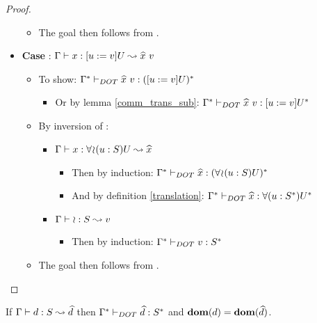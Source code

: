 \begin{proof}
\begin{itemize}
\begin{itemize}
\begin{itemize}
\begin{itemize}
                \end{itemize}
            \end{itemize}
            \item The goal then follows from .
        \end{itemize}
        \item \textbf{Case} :
            $\Gamma \vdash x: [u := v]U \leadsto \widehat{x}\ v$
        \begin{itemize}
            \item To show:
                $\TJT{\TRANS{\Gamma}}{\HAT{x}\ v}{\TRANS{(\SUB{u}{v}U)}}$
            \begin{itemize}
                \item Or by lemma \ref{comm_trans_sub}:
                    $\TJT{\TRANS{\Gamma}}{\HAT{x}\ v}{\SUB{u}{v}\TRANS{U}}$
            \end{itemize}
            \item By inversion of :
            \begin{itemize}
                \item $\Gamma \vdash x: \forall\!\wr\!(u:S)U \leadsto \widehat{x}$
                \begin{itemize}
                    \item Then by induction:
                        $\Gamma^{*} \vdash_{DOT} \widehat{x}: (\forall\!\wr\!(u:S)U)^{*}$
                    \item And by definition \ref{translation}:
                        $\Gamma^{*} \vdash_{DOT} \widehat{x}: \forall(u:S^{*})U^{*}$
                \end{itemize}
                \item $\Gamma \vdash \wr: S \leadsto v$
                \begin{itemize}
                    \item Then by induction:
                        $\Gamma^{*} \vdash_{DOT} v: S^{*}$
                \end{itemize}
            \end{itemize}
        \item The goal then follows from .
        \end{itemize}
    \end{itemize}
\end{proof}

\begin{THEOREM}
    \label{tp_defs}
    If $\Gamma \vdash d: S \leadsto \widehat{d}$ then
    $\Gamma^{*} \vdash_{DOT} \widehat{d}: S^{*}$ and $\textbf{dom}(d) =
    \textbf{dom}(\widehat{d})$.
\end{THEOREM}

